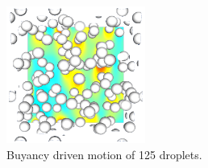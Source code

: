 \documentclass{icnmmf5}
\begin{document}
\begin{figure}[b]
  \begin{center}
   \includegraphics[height=4.5cm]{image/3D/P_PHI_5.png}
  \end{center}
  \caption{Buyancy driven motion of 125 droplets.}%
  \label{fig:tower}
\end{figure}

\end{document}
